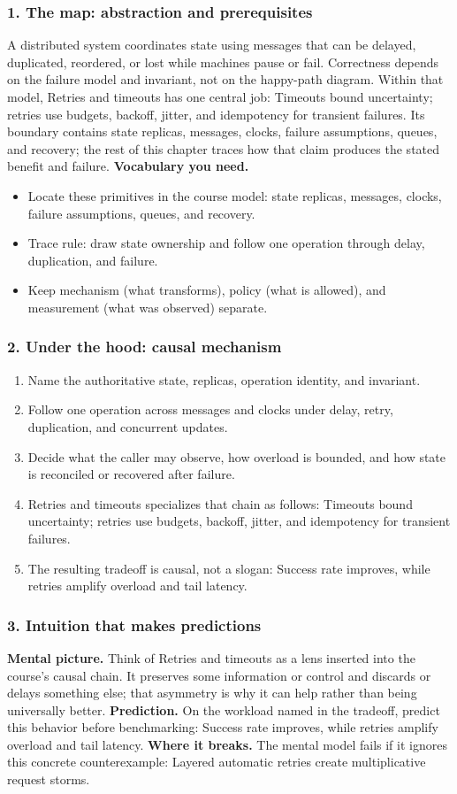 \subsubsection*{1. The map: abstraction and prerequisites}
A distributed system coordinates state using messages that can be delayed, duplicated, reordered, or lost while machines pause or fail. Correctness depends on the failure model and invariant, not on the happy-path diagram.
Within that model, Retries and timeouts has one central job: Timeouts bound uncertainty; retries use budgets, backoff, jitter, and idempotency for transient failures. Its boundary contains state replicas, messages, clocks, failure assumptions, queues, and recovery; the rest of this chapter traces how that claim produces the stated benefit and failure.
\textbf{Vocabulary you need.}\begin{itemize}
\item Locate these primitives in the course model: state replicas, messages, clocks, failure assumptions, queues, and recovery.
\item Trace rule: draw state ownership and follow one operation through delay, duplication, and failure.
\item Keep mechanism (what transforms), policy (what is allowed), and measurement (what was observed) separate.
\end{itemize}
\subsubsection*{2. Under the hood: causal mechanism}\begin{enumerate}
\item Name the authoritative state, replicas, operation identity, and invariant.
\item Follow one operation across messages and clocks under delay, retry, duplication, and concurrent updates.
\item Decide what the caller may observe, how overload is bounded, and how state is reconciled or recovered after failure.
\item Retries and timeouts specializes that chain as follows: Timeouts bound uncertainty; retries use budgets, backoff, jitter, and idempotency for transient failures.
\item The resulting tradeoff is causal, not a slogan: Success rate improves, while retries amplify overload and tail latency.
\end{enumerate}
\subsubsection*{3. Intuition that makes predictions}
\textbf{Mental picture.} Think of Retries and timeouts as a lens inserted into the course's causal chain. It preserves some information or control and discards or delays something else; that asymmetry is why it can help rather than being universally better.
\textbf{Prediction.} On the workload named in the tradeoff, predict this behavior before benchmarking: Success rate improves, while retries amplify overload and tail latency.
\textbf{Where it breaks.} The mental model fails if it ignores this concrete counterexample: Layered automatic retries create multiplicative request storms.
